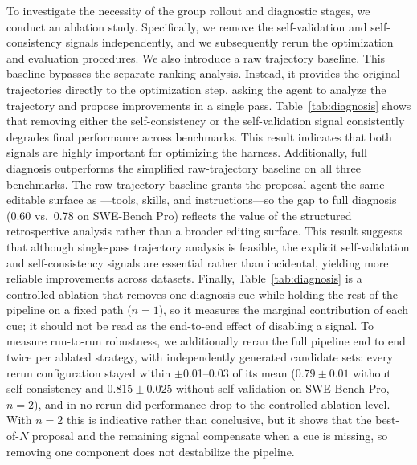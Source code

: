 To investigate the necessity of the group rollout and diagnostic stages, we conduct an ablation study.
Specifically, we remove the self-validation and self-consistency signals independently, and we subsequently rerun the optimization and evaluation procedures.
We also introduce a raw trajectory baseline.
This baseline bypasses the separate ranking analysis. Instead, it provides the original trajectories directly to the optimization step, asking the agent to analyze the trajectory and propose improvements in a single pass.
Table~\ref{tab:diagnosis} shows that removing either the self-consistency or the self-validation signal consistently degrades final performance across benchmarks.
This result indicates that both signals are highly important for optimizing the harness.
Additionally, full diagnosis outperforms the simplified raw-trajectory baseline on all three benchmarks.
The raw-trajectory baseline grants the proposal agent the same editable surface as \method{}---tools, skills, and instructions---so the gap to full diagnosis (0.60 vs.\ 0.78 on SWE-Bench Pro) reflects the value of the structured retrospective analysis rather than a broader editing surface.
This result suggests that although single-pass trajectory analysis is feasible, the explicit self-validation and self-consistency signals are essential rather than incidental, yielding more reliable improvements across datasets.
Finally, Table~\ref{tab:diagnosis} is a controlled ablation that removes one diagnosis cue while holding the rest of the pipeline on a fixed path ($n{=}1$), so it measures the marginal contribution of each cue; it should not be read as the end-to-end effect of disabling a signal.
To measure run-to-run robustness, we additionally reran the full pipeline end to end twice per ablated strategy, with independently generated candidate sets: every rerun configuration stayed within $\pm$0.01--0.03 of its mean ($0.79 \pm 0.01$ without self-consistency and $0.815 \pm 0.025$ without self-validation on SWE-Bench Pro, $n{=}2$), and in no rerun did performance drop to the controlled-ablation level.
With $n{=}2$ this is indicative rather than conclusive, but it shows that the best-of-$N$ proposal and the remaining signal compensate when a cue is missing, so removing one component does not destabilize the pipeline.

